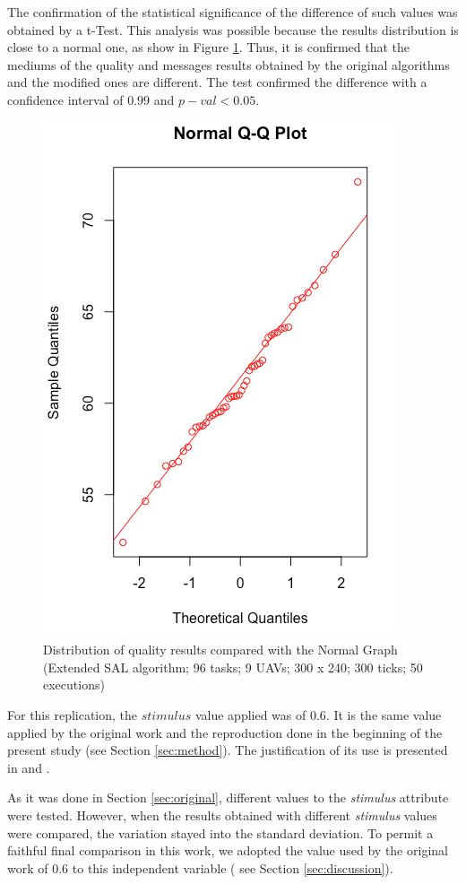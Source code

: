The confirmation of the statistical significance of the difference of such values was obtained by a t-Test. This analysis was possible because the results distribution is close to a normal one, as show in Figure \ref{fig:fig07}. Thus, it is confirmed that the mediums of the quality and messages results obtained by the original algorithms and the modified ones are different. The test confirmed the difference with a confidence interval of $0.99$ and $p-val<0.05$. 

\begin{figure}[h!]
	\begin{center}
		\includegraphics[scale=0.4]{fig/fig07.png}
		\caption{Distribution of quality results compared with the Normal Graph (Extended SAL algorithm; 96 tasks; 9 UAVs; 300 x 240; 300 ticks; 50 executions)}
		\label{fig:fig07}
	\end{center}
\end{figure}

For this replication, the $stimulus$ value applied was of $0.6$. It is the same value applied by the original work and the reproduction done in the beginning of the present study (see Section \ref{sec:method}). The justification of its use is presented in \cite{MAS07} and \cite{ferreira2007swarm}.

As it was done in Section \ref{sec:original}, different values to the \textit{stimulus} attribute were tested. However, when the results obtained with different \textit{stimulus} values were compared, the variation stayed into the standard deviation. To permit a faithful final comparison in this work, we adopted the value used by the original work \cite{MAS07} of $0.6$ to this independent variable ( see Section \ref{sec:discussion}).
